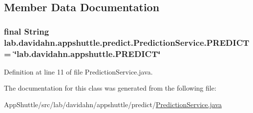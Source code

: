 \subsection{\-Member \-Data \-Documentation}
\hypertarget{classlab_1_1davidahn_1_1appshuttle_1_1predict_1_1_prediction_service_af69a5c4dfabed3f2102f9efc8260aff5}{
\subsubsection[{\-P\-R\-E\-D\-I\-C\-T}]{\setlength{\rightskip}{0pt plus 5cm}final \-String {\bf lab.\-davidahn.\-appshuttle.\-predict.\-Prediction\-Service.\-P\-R\-E\-D\-I\-C\-T} = \char`\"{}lab.\-davidahn.\-appshuttle.\-P\-R\-E\-D\-I\-C\-T\char`\"{}}}\label{classlab_1_1davidahn_1_1appshuttle_1_1predict_1_1_prediction_service_af69a5c4dfabed3f2102f9efc8260aff5}


\-Definition at line 11 of file \-Prediction\-Service.\-java.



\-The documentation for this class was generated from the following file\-:\begin{DoxyCompactItemize}
\item 
\-App\-Shuttle/src/lab/davidahn/appshuttle/predict/\hyperlink{_prediction_service_8java}{\-Prediction\-Service.\-java}\end{DoxyCompactItemize}
